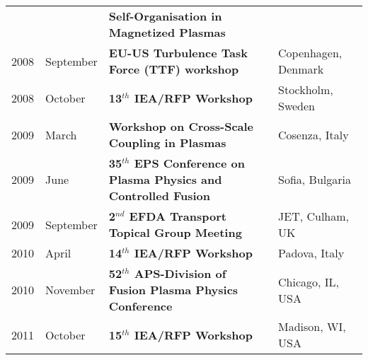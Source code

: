 \begin{longtable}{llll}
& & \textbf{Self-Organisation in Magnetized Plasmas} & \\
2008 & September & \textbf{EU-US Turbulence Task Force (TTF) workshop}
& Copenhagen, Denmark \\
2008 & October & \textbf{13$^{th}$ IEA/RFP Workshop} & Stockholm,
Sweden \\
2009 & March & \textbf{Workshop on Cross-Scale Coupling in Plasmas} &
Cosenza, Italy  \\
2009 & June & \textbf{35$^{th}$ EPS Conference on Plasma Physics and
  Controlled Fusion} & Sofia, Bulgaria \\
2009 & September & \textbf{2$^{nd}$ EFDA Transport Topical Group
  Meeting} & JET, Culham, UK \\
2010 & April & \textbf{14$^{th}$ IEA/RFP Workshop} & Padova, Italy \\
2010 & November & \textbf{52$^{th}$ APS-Division of Fusion Plasma
  Physics Conference} & Chicago, IL, USA \\
2011 & October & \textbf{15$^{th}$ IEA/RFP Workshop} & Madison, WI, USA \\
\end{longtable}
